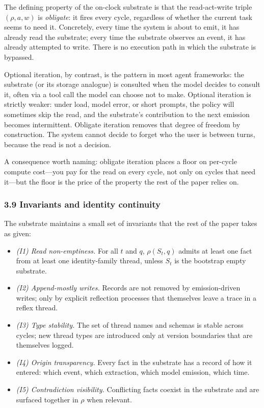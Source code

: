 \documentclass[11pt,letterpaper]{article}
\begin{document}
The defining property of the on-clock substrate is that the read-act-write triple $(\rho, a, w)$ is \emph{obligate}: it fires every cycle, regardless of whether the current task seems to need it. Concretely, every time the system is about to emit, it has already read the substrate; every time the substrate observes an event, it has already attempted to write. There is no execution path in which the substrate is bypassed.

Optional iteration, by contrast, is the pattern in most agent frameworks: the substrate (or its storage analogue) is consulted when the model decides to consult it, often via a tool call the model can choose not to make. Optional iteration is strictly weaker: under load, model error, or short prompts, the policy will sometimes skip the read, and the substrate's contribution to the next emission becomes intermittent. Obligate iteration removes that degree of freedom by construction. The system cannot decide to forget who the user is between turns, because the read is not a decision.

A consequence worth naming: obligate iteration places a floor on per-cycle compute cost---you pay for the read on every cycle, not only on cycles that need it---but the floor is the price of the property the rest of the paper relies on.

\subsubsection*{3.9 Invariants and identity continuity}

The substrate maintains a small set of invariants that the rest of the paper takes as given:

\begin{itemize}
  \item \emph{(I1) Read non-emptiness.} For all $t$ and $q$, $\rho(S_t, q)$ admits at least one fact from at least one identity-family thread, unless $S_t$ is the bootstrap empty substrate.
  \item \emph{(I2) Append-mostly writes.} Records are not removed by emission-driven writes; only by explicit reflection processes that themselves leave a trace in a reflex thread.
  \item \emph{(I3) Type stability.} The set of thread names and schemas is stable across cycles; new thread types are introduced only at version boundaries that are themselves logged.
  \item \emph{(I4) Origin transparency.} Every fact in the substrate has a record of how it entered: which event, which extraction, which model emission, which time.
  \item \emph{(I5) Contradiction visibility.} Conflicting facts coexist in the substrate and are surfaced together in $\rho$ when relevant.
\end{itemize}
\end{document}
